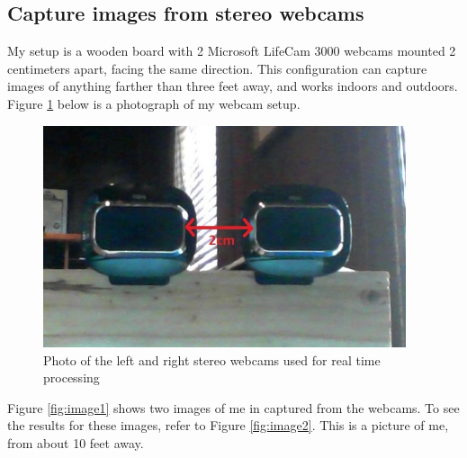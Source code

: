 \documentclass[11pt,fleqn]{article}
\begin{document}
\subsection{Capture images from stereo webcams}
My setup is a wooden board with 2 Microsoft LifeCam 3000 webcams mounted 2 centimeters apart, facing the same direction. This configuration can capture images of anything farther than three feet away, and works indoors and outdoors. Figure \ref{fig:cam} below is a photograph of my webcam setup.

\begin{figure}[!ht]
\begin{mdframed}
\centering
\includegraphics[width=0.95\textwidth, trim=30 50 45 50, clip]{images/setup.jpg}
\caption[Photo of the stereo webcams used for real time processing]{Photo of the left and right stereo webcams used for real time processing}
\label{fig:cam}
\end{mdframed}
\end{figure}


Figure \ref{fig:image1} shows two images of me in captured from the webcams. To see the results for these images, refer to Figure \ref{fig:image2}.
This is a picture of me, from about 10 feet away.
\end{document}
